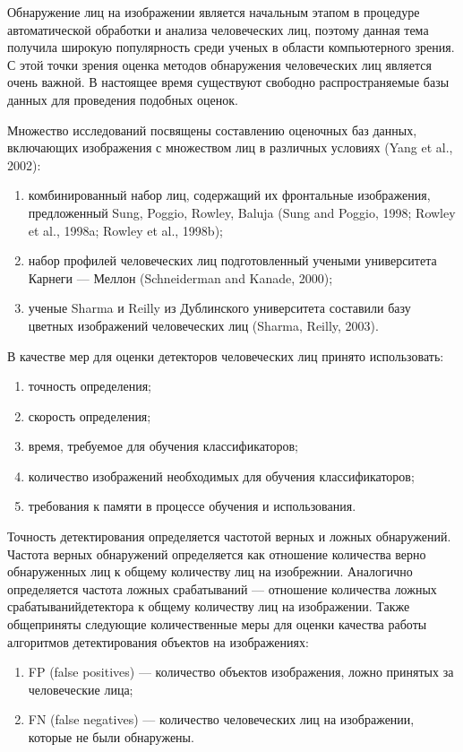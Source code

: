 Обнаружение лиц на изображении является начальным этапом в процедуре автоматической обработки и анализа человеческих лиц, поэтому данная тема получила широкую популярность среди ученых в области компьютерного зрения. С этой точки зрения оценка методов обнаружения человеческих лиц является очень важной. В настоящее время существуют свободно распространяемые базы данных для проведения подобных оценок. 

Множество исследований посвящены составлению оценочных баз данных, включающих изображения с множеством лиц в различных условиях (Yang et al., 2002): 

\begin{enumerate}
	\item комбинированный набор лиц, содержащий их фронтальные изображения, предложенный Sung, Poggio, Rowley, Baluja (Sung and Poggio, 1998; Rowley et al., 1998a; Rowley et al., 1998b);
	\item набор профилей человеческих лиц подготовленный учеными университета Карнеги — Меллон (Schneiderman and Kanade, 2000);
	\item ученые Sharma и Reilly из Дублинского университета  составили базу цветных изображений человеческих лиц (Sharma, Reilly, 2003).
\end{enumerate}

В качестве мер для оценки детекторов человеческих лиц принято использовать:
\begin{enumerate}
	\item точность определения;
	\item скорость определения;
	\item время, требуемое для обучения классификаторов;
	\item количество изображений необходимых для обучения классификаторов;
	\item требования к памяти в процессе обучения и использования.
\end{enumerate}

Точность детектирования определяется частотой верных и ложных обнаружений. Частота верных обнаружений определяется как отношение количества верно обнаруженных лиц к общему количеству лиц на изобрежнии. Аналогично определяется частота ложных срабатываний --- отношение количества ложных срабатыванийдетектора к общему количеству лиц на изображении. Также общеприняты следующие количественные меры для оценки качества работы алгоритмов детектирования объектов на изображениях:

\begin{enumerate}
	\item FP (false positives) --- количество объектов изображения, ложно принятых за человеческие лица;
	\item FN (false negatives) --- количество человеческих лиц на изображении, которые не были обнаружены. 
\end{enumerate}

